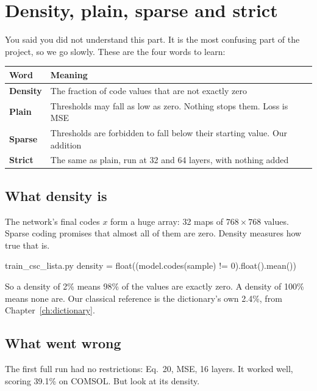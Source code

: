 \chapter{Density, plain, sparse and strict}\label{ch:density}

You said you did not understand this part. It is the most confusing part of the project, so we go
slowly. These are the four words to learn:

\begin{center}
\begin{tabularx}{\textwidth}{lX}
\toprule
Word & Meaning \\
\midrule
\textbf{Density} & The fraction of code values that are not exactly zero \\
\textbf{Plain} & Thresholds may fall as low as zero. Nothing stops them. Loss is MSE \\
\textbf{Sparse} & Thresholds are forbidden to fall below their starting value. Our addition \\
\textbf{Strict} & The same as plain, run at 32 and 64 layers, with nothing added \\
\bottomrule
\end{tabularx}
\end{center}

\section{What density is}

The network's final codes $x$ form a huge array: 32 maps of $768\times768$ values. Sparse coding promises
that almost all of them are zero. Density measures how true that is.

\begin{code*}{train_csc_lista.py}
                density = float((model.codes(sample) != 0).float().mean())
\end{code*}

So a density of 2\% means 98\% of the values are exactly zero. A density of 100\% means none are.
Our classical reference is the dictionary's own 2.4\%, from Chapter~\ref{ch:dictionary}.

\section{What went wrong}

The first full run had no restrictions: Eq.~20, MSE, 16 layers. It worked well, scoring 39.1\% on COMSOL. But
look at its density.


